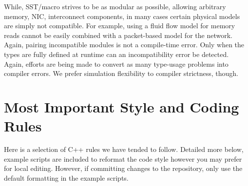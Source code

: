 While, SST/macro strives to be as modular as possible, allowing arbitrary memory, NIC, interconnect components,
in many cases certain physical models are simply not compatible.
For example, using a fluid flow model for memory reads cannot be easily combined with a packet-based model for the network.
Again, pairing incompatible modules is not a compile-time error.
Only when the types are fully defined at runtime can an incompatibility error be detected.
Again, efforts are being made to convert as many type-usage problems into compiler errors.
We prefer simulation flexibility to compiler strictness, though. 

\section{Most Important Style and Coding Rules}\label{sec:stylerules}
Here is a selection of C++ rules we have tended to follow.  
Detailed more below, example scripts are included to reformat the code style however you may prefer for local editing.
However, if committing changes to the repository, only use the default formatting in the example scripts.
